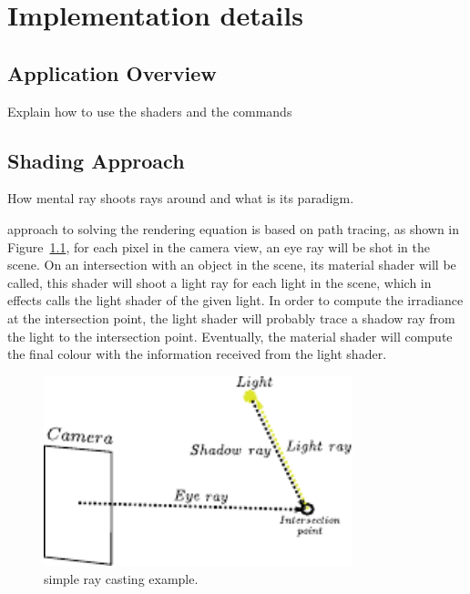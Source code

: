 \chapter{Implementation details}
\label{ch:implementation_details}


\section{Application Overview}
\label{sec:application_overview}

Explain how to use the shaders and the commands


\section{\MentalRay Shading Approach}
\label{sec:mental_ray_shading_approach}

How mental ray shoots rays around and what is its paradigm.

\MentalRay approach to solving the rendering equation is based on path tracing, as shown in Figure~\ref{fig:mental_ray_model}, for each pixel in the camera view, an eye ray will be shot in the scene.
On an intersection with an object in the scene, its material shader will be called, this shader will shoot a light ray for each light in the scene, which in effects calls the light shader of the given light.
In order to compute the irradiance at the intersection point, the light shader will probably trace a shadow ray from the light to the intersection point.
Eventually, the material shader will compute the final colour with the information received from the light shader. 

\begin{figure}[htbp!]
\centering
\includegraphics[width=0.8\textwidth]{img/mental_ray_model}
	\caption{\MentalRay simple ray casting example.}
	\label{fig:mental_ray_model}
\end{figure}

